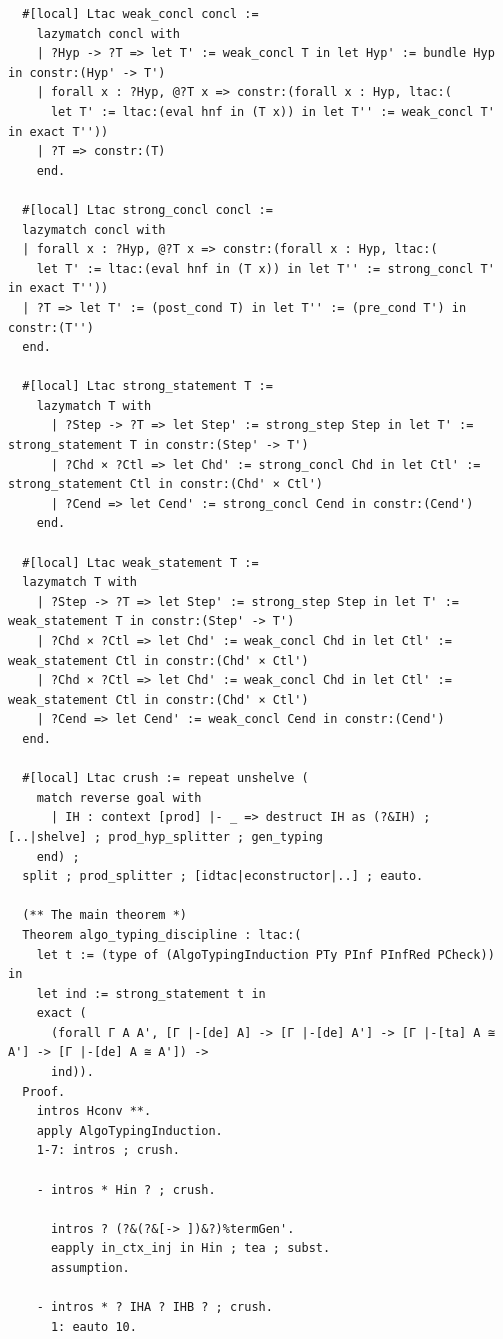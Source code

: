 \begin{lstlisting}
  #[local] Ltac weak_concl concl :=
    lazymatch concl with
    | ?Hyp -> ?T => let T' := weak_concl T in let Hyp' := bundle Hyp in constr:(Hyp' -> T')
    | forall x : ?Hyp, @?T x => constr:(forall x : Hyp, ltac:(
      let T' := ltac:(eval hnf in (T x)) in let T'' := weak_concl T' in exact T''))
    | ?T => constr:(T)
    end.

  #[local] Ltac strong_concl concl :=
  lazymatch concl with
  | forall x : ?Hyp, @?T x => constr:(forall x : Hyp, ltac:(
    let T' := ltac:(eval hnf in (T x)) in let T'' := strong_concl T' in exact T''))
  | ?T => let T' := (post_cond T) in let T'' := (pre_cond T') in constr:(T'')
  end.

  #[local] Ltac strong_statement T :=
    lazymatch T with
      | ?Step -> ?T => let Step' := strong_step Step in let T' := strong_statement T in constr:(Step' -> T')
      | ?Chd × ?Ctl => let Chd' := strong_concl Chd in let Ctl' := strong_statement Ctl in constr:(Chd' × Ctl')
      | ?Cend => let Cend' := strong_concl Cend in constr:(Cend')
    end.

  #[local] Ltac weak_statement T :=
  lazymatch T with
    | ?Step -> ?T => let Step' := strong_step Step in let T' := weak_statement T in constr:(Step' -> T')
    | ?Chd × ?Ctl => let Chd' := weak_concl Chd in let Ctl' := weak_statement Ctl in constr:(Chd' × Ctl')
    | ?Chd × ?Ctl => let Chd' := weak_concl Chd in let Ctl' := weak_statement Ctl in constr:(Chd' × Ctl')
    | ?Cend => let Cend' := weak_concl Cend in constr:(Cend')
  end.

  #[local] Ltac crush := repeat unshelve (
    match reverse goal with
      | IH : context [prod] |- _ => destruct IH as (?&IH) ; [..|shelve] ; prod_hyp_splitter ; gen_typing
    end) ;
  split ; prod_splitter ; [idtac|econstructor|..] ; eauto.

  (** The main theorem *)
  Theorem algo_typing_discipline : ltac:(
    let t := (type of (AlgoTypingInduction PTy PInf PInfRed PCheck)) in
    let ind := strong_statement t in
    exact (
      (forall Γ A A', [Γ |-[de] A] -> [Γ |-[de] A'] -> [Γ |-[ta] A ≅ A'] -> [Γ |-[de] A ≅ A']) ->
      ind)).
  Proof.
    intros Hconv **.
    apply AlgoTypingInduction.
    1-7: intros ; crush.

    - intros * Hin ? ; crush.

      intros ? (?&(?&[-> ])&?)%termGen'.
      eapply in_ctx_inj in Hin ; tea ; subst.
      assumption.

    - intros * ? IHA ? IHB ? ; crush.
      1: eauto 10.


\end{lstlisting}
